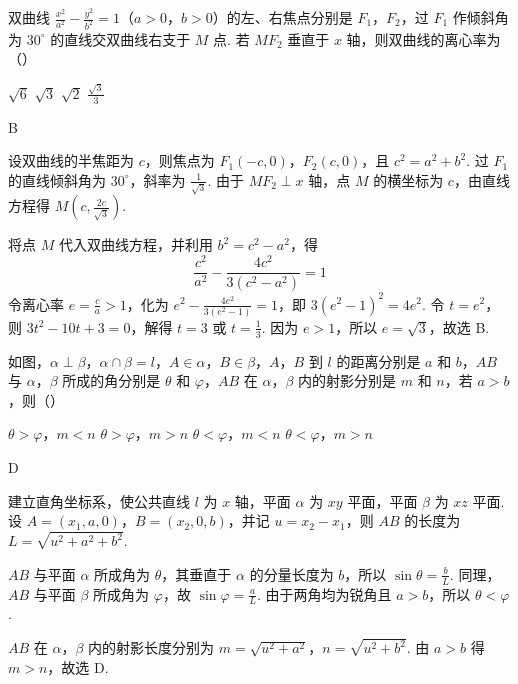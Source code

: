 \begin{problem}
双曲线 \(\frac{x^2}{a^2} - \frac{y^2}{b^2} = 1\)（\(a > 0\)，\(b > 0\)）的左、右焦点分别是 \(F_1\)，\(F_2\)，过 \(F_1\) 作倾斜角为 \(30^\circ\) 的直线交双曲线右支于 \(M\) 点. 若 \(MF_2\) 垂直于 \(x\) 轴，则双曲线的离心率为（\quad）

\choices
    {\(\sqrt{6}\)}
    {\(\sqrt{3}\)}
    {\(\sqrt{2}\)}
    {\(\frac{\sqrt{3}}{3}\)}
\end{problem}

\begin{answer}
B
\end{answer}

\begin{solution}
设双曲线的半焦距为 \(c\)，则焦点为 \(F_1(-c,0)\)，\(F_2(c,0)\)，且
\(c^2=a^2+b^2\). 过 \(F_1\) 的直线倾斜角为 \(30^{\circ}\)，斜率为 \(\frac{1}{\sqrt{3}}\).
由于 \(MF_2\perp x\) 轴，点 \(M\) 的横坐标为 \(c\)，由直线方程得
\(M\left(c,\frac{2c}{\sqrt{3}}\right)\).

将点 \(M\) 代入双曲线方程，并利用 \(b^2=c^2-a^2\)，得
\[
\frac{c^2}{a^2}-\frac{4c^2}{3(c^2-a^2)}=1
\]
令离心率 \(e=\frac{c}{a}>1\)，化为
\(e^2-\frac{4e^2}{3(e^2-1)}=1\)，即
\(3(e^2-1)^2=4e^2\).
令 \(t=e^2\)，则 \(3t^2-10t+3=0\)，解得 \(t=3\) 或 \(t=\frac{1}{3}\). 因为 \(e>1\)，所以 \(e=\sqrt{3}\)，故选 B.
\end{solution}

\begin{problem}
如图，\(\alpha \perp \beta\)，\(\alpha \cap \beta = l\)，\(A \in \alpha\)，\(B \in \beta\)，\(A\)，\(B\) 到 \(l\) 的距离分别是 \(a\) 和 \(b\)，\(AB\) 与 \(\alpha\)，\(\beta\) 所成的角分别是 \(\theta\) 和 \(\varphi\)，\(AB\) 在 \(\alpha\)，\(\beta\) 内的射影分别是 \(m\) 和 \(n\)，若 \(a > b\)，则（\quad）


\choices
    {\(\theta >\varphi\)，\(m < n\)}
    {\(\theta >\varphi\)，\(m > n\)}
    {\(\theta < \varphi\)，\(m < n\)}
    {\(\theta < \varphi\)，\(m > n\)}
\end{problem}

\begin{answer}
D
\end{answer}

\begin{solution}
建立直角坐标系，使公共直线 \(l\) 为 \(x\) 轴，平面 \(\alpha\) 为 \(xy\) 平面，平面 \(\beta\) 为 \(xz\) 平面. 设 \(A=(x_1,a,0)\)，\(B=(x_2,0,b)\)，并记 \(u=x_2-x_1\)，则
\(AB\) 的长度为 \(L=\sqrt{u^2+a^2+b^2}\).

\(AB\) 与平面 \(\alpha\) 所成角为 \(\theta\)，其垂直于 \(\alpha\) 的分量长度为 \(b\)，所以 \(\sin\theta=\frac{b}{L}\). 同理，\(AB\) 与平面 \(\beta\) 所成角为 \(\varphi\)，故 \(\sin\varphi=\frac{a}{L}\). 由于两角均为锐角且 \(a>b\)，所以 \(\theta<\varphi\).

\(AB\) 在 \(\alpha\)，\(\beta\) 内的射影长度分别为
\(m=\sqrt{u^2+a^2}\)，\(n=\sqrt{u^2+b^2}\). 由 \(a>b\) 得 \(m>n\)，故选 D.
\end{solution}

